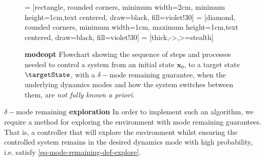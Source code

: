 \documentclass{mimosis-class/mimosis}
\numberwithin{equation}{chapter}
\newcommand{\state}{\ensuremath{\mathbf{x}}}
\begin{document}
{\begin{figure}[t!]
 = [rectangle, rounded corners, minimum width=2cm, minimum height=1cm,text centered, draw=black, fill=violet!30]
 = [diamond, rounded corners, minimum width=1cm, maximum height=1cm,text centered, draw=black, fill=violet!30]
 = [thick,->,>=stealth]
\centering
{}
\caption[Flowchart showing the sequence of steps of \acrshort{modeopt}]{\textbf{\acrshort{modeopt}} Flowchart showing the sequence of steps and processes needed to control a system
from an initial state $\state_0$, to a target state $\targetState$, with a $\delta-\text{mode remaining}$ guarantee,
when the underlying dynamics modes and how
the system switches between them, are \textit{not fully known a priori}.}
\label{fig-mode-opt-loop}
\end{figure}
\newline

\textbf{\(\delta-\text{mode remaining}\) exploration}
In order to implement such an algorithm, we require a method for exploring the environment
with mode remaining guarantees.
That is, a controller that will explore the environment whilst ensuring the controlled system remains in the
desired dynamics mode with high probability, i.e. satisfy \cref{eq-mode-remaining-def-explore}.

}
\end{document}
